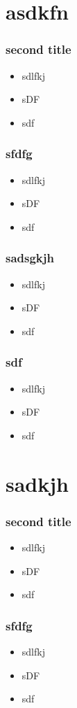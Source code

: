 \documentclass{beamer}
\begin{document}
\section{asdkfn}
\begin{frame}
    \frametitle{second title}
    \begin{itemize}
        \item sdlfkj
        \item sDF
        \item sdf
    \end{itemize}
\end{frame}
\begin{frame}
    \frametitle{sfdfg}
    \begin{itemize}
        \item sdlfkj
        \item sDF
        \item sdf
    \end{itemize}
\end{frame}
\begin{frame}
    \frametitle{sadsgkjh}
    \begin{itemize}
        \item sdlfkj
        \item sDF
        \item sdf
    \end{itemize}
\end{frame}
\begin{frame}
    \frametitle{sdf}
    \begin{itemize}
        \item sdlfkj
        \item sDF
        \item sdf
    \end{itemize}
\end{frame}

\section{sadkjh}
\begin{frame}
    \frametitle{second title}
    \begin{itemize}
        \item sdlfkj
        \item sDF
        \item sdf
    \end{itemize}
\end{frame}
\begin{frame}
    \frametitle{sfdfg}
    \begin{itemize}
        \item sdlfkj
        \item sDF
        \item sdf
    \end{itemize}
\end{frame}
\end{document}
